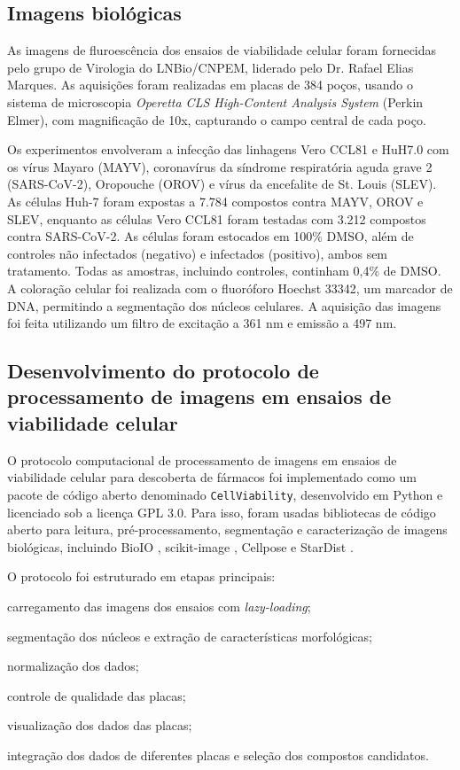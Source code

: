 \documentclass[12pt]{article}
\begin{document}
\subsection{Imagens biológicas}

As imagens de fluroescência dos ensaios de viabilidade celular foram fornecidas pelo grupo de Virologia do LNBio/CNPEM, liderado pelo Dr. Rafael Elias Marques. As aquisições foram realizadas em placas de 384 poços, usando o sistema de microscopia \textit{Operetta CLS High-Content Analysis System} (Perkin Elmer), com magnificação de 10x, capturando o campo central de cada poço.

Os experimentos envolveram a infecção das linhagens Vero CCL81 e HuH7.0 com os vírus Mayaro (MAYV), coronavírus da síndrome respiratória aguda grave 2 (SARS-CoV-2), Oropouche (OROV) e vírus da encefalite de St. Louis (SLEV). As células Huh-7 foram expostas a 7.784 compostos contra MAYV, OROV e SLEV, enquanto as células Vero CCL81 foram testadas com 3.212 compostos contra SARS-CoV-2. As células foram estocados em 100\% DMSO, além de controles não infectados (negativo) e infectados (positivo), ambos sem tratamento. Todas as amostras, incluindo controles, continham 0,4\% de DMSO. A coloração celular foi realizada com o fluoróforo Hoechst 33342, um marcador de DNA, permitindo a segmentação dos núcleos celulares. A aquisição das imagens foi feita utilizando um filtro de excitação a 361 nm e emissão a 497 nm.

\subsection{Desenvolvimento do protocolo de processamento de imagens em ensaios de viabilidade celular}

O protocolo computacional de processamento de imagens em ensaios de viabilidade celular para descoberta de fármacos foi implementado como um pacote de código aberto denominado \texttt{CellViability}, desenvolvido em Python e licenciado sob a licença GPL 3.0. Para isso, foram usadas bibliotecas de código aberto para leitura, pré-processamento, segmentação e caracterização de imagens biológicas, incluindo BioIO \cite{bioio}, scikit-image \cite{vanderWalt2014}, Cellpose \cite{Stringer2020,Stringer2025,Pachitariu2025} e StarDist \cite{Schmidt2018,Weigert2020,Weigert2022}.

O protocolo foi estruturado em etapas principais:
\begin{enumerate*}[label=(\arabic*)]
  \item carregamento das imagens dos ensaios com \textit{lazy-loading};
  \item segmentação dos núcleos e extração de características morfológicas;
  \item normalização dos dados;
  \item controle de qualidade das placas;
  \item visualização dos dados das placas;
  \item integração dos dados de diferentes placas e seleção dos compostos candidatos.
\end{enumerate*}
\end{document}
